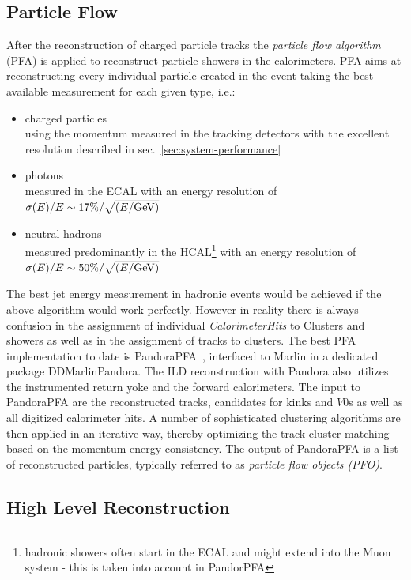\subsection{Particle Flow}

After the reconstruction of charged particle tracks the  \emph{particle flow algorithm} (PFA) is applied
to reconstruct particle showers in the calorimeters.  PFA aims at reconstructing every individual particle
created in the event taking the best available measurement for each given type, i.e.:
\begin{itemize}
\item charged particles\\
  using the momentum measured in the tracking detectors with the excellent resolution described in sec.~\ref{sec:system-performance}
\item photons\\
  measured in the ECAL with an energy resolution of $\sigma(E)/E \sim  17\% / \sqrt{(E/\rm{GeV})}$
\item neutral hadrons\\
  measured predominantly in the HCAL\footnote{hadronic showers often start in the ECAL and might extend into the Muon system -
    this is taken into account in PandorPFA} with an energy resolution of $\sigma(E)/E \sim  50\% / \sqrt{(E/\rm{GeV})}$ %
\end{itemize}

 The best jet energy measurement in hadronic events would be achieved if the above algorithm would work perfectly. However in reality
 there is always confusion in the assignment of individual \emph{CalorimeterHits} to Clusters and showers as well as in the assignment
 of tracks to clusters. The best PFA implementation to date is PandoraPFA~\cite{Marshall:2015rfa},  interfaced to Marlin in a dedicated package
 DDMarlinPandora. The ILD reconstruction with Pandora also utilizes the instrumented return yoke and the forward calorimeters.
 The input to PandoraPFA are the reconstructed tracks, candidates for  kinks and  $V0$s as well as all digitized calorimeter hits.
 A number of sophisticated clustering algorithms are then applied in an iterative way, thereby optimizing the track-cluster matching
 based on the momentum-energy consistency. The output of PandoraPFA is a list of reconstructed particles, typically referred to as
 \emph{particle flow objects (PFO)}.

\subsection{\label{sec:model:hlr} High Level Reconstruction}

